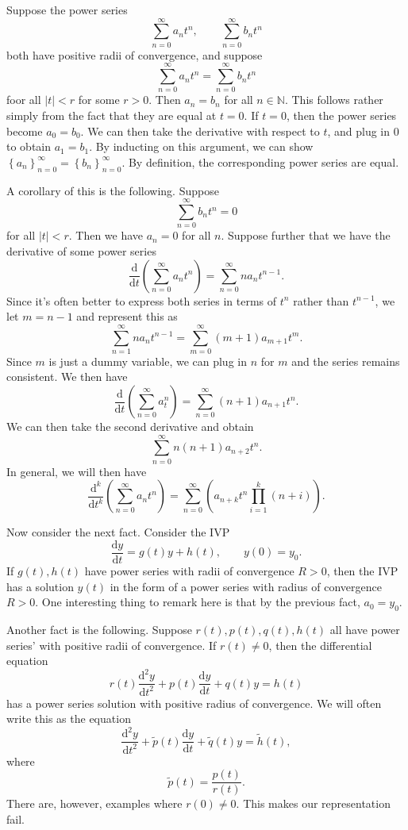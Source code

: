 Suppose the power series
\[
	\sum_{n=0}^{\infty} a_nt^n,\qquad \sum_{n=0}^{\infty} b_nt^n
\]
both have positive radii of convergence, and suppose
\[
	\sum_{n=0}^{\infty} a_nt^n=\sum_{n=0}^{\infty} b_nt^n
\]
foor all $\left| t \right| <r$ for some $r>0$. Then $a_n=b_n$ for all $n\in\mathbb{N}$. This follows rather simply from the fact that they are equal at $t=0$. If $t=0$, then the power series become $a_0=b_0$. We can then take the derivative with respect to $t$, and plug in $0$ to obtain $a_1=b_1$. By inducting on this argument, we can show $\left\{ a_n \right\}_{n=0}^\infty=\left\{ b_n \right\}_{n=0}^\infty$. By definition, the corresponding power series are equal.

A corollary of this is the following. Suppose
\[
	\sum_{n=0}^{\infty} b_nt^n=0
\]
for all $\left| t \right| <r$. Then we have $a_n=0$ for all $n$. Suppose further that we have the derivative of some power series
\[
	\frac{\mathrm{d}}{\mathrm{d}t} \left( \sum_{n=0}^{\infty} a_nt^n \right) =\sum_{n=0}^{\infty} na_nt^{n-1}
.\]
Since it's often better to express both series in terms of $t^n$ rather than $t^{n-1}$, we let $m=n-1$ and represent this as
\[
	\sum_{n=1}^{\infty} na_nt^{n-1}=\sum_{m=0}^{\infty} (m+1)a_{m+1}t^{m}
.\]
Since $m$ is just a dummy variable, we can plug in $n$ for $m$ and the series remains consistent. We then have
\[
	\frac{\mathrm{d}}{\mathrm{d}t} \left( \sum_{n=0}^{\infty} a_t^n \right) =\sum_{n=0}^{\infty} (n+1)a_{n+1}t^n
.\]
We can then take the second derivative and obtain
\[
	\sum_{n=0}^{\infty} n(n+1)a_{n+2}t^n
.\]
In general, we will then have
\[
	\frac{\mathrm{d}^k}{\mathrm{d}t^k} \left( \sum_{n=0}^{\infty} a_nt^n \right)=\sum_{n=0}^{\infty}\left( a_{n+k}t^n \prod_{i=1}^k (n+i) \right) 
.\]

Now consider the next fact. Consider the IVP
\[
	\frac{\mathrm{d}y}{\mathrm{d}t} =g(t)y+h(t),\qquad y(0)=y_0
.\]
If $g(t),h(t)$ have power series with radii of convergence $R>0$, then the IVP has a solution $y(t)$ in the form of a power series with radius of convergence $R>0$. One interesting thing to remark here is that by the previous fact, $a_0=y_0$.

Another fact is the following. Suppose $r(t),p(t),q(t),h\left(t \right) $ all have power series' with positive radii of convergence. If $r(t)\neq 0$, then the differential equation
\[
	r(t) \frac{\mathrm{d}^2y}{\mathrm{d}t^2} +p(t) \frac{\mathrm{d}y}{\mathrm{d}t} +q(t)y=h(t)
\]
has a power series solution with positive radius of convergence. We will often write this as the equation
\[
	\frac{\mathrm{d}^2y}{\mathrm{d}t^2} +\tilde{p}(t) \frac{\mathrm{d}y}{\mathrm{d}t} +\tilde{q}(t)y=\tilde{h}(t)
,\]
where
\[
	\tilde{p}(t)=\frac{p(t)}{r(t)}
.\]
There are, however, examples where $r(0)\neq 0$. This makes our representation fail.
